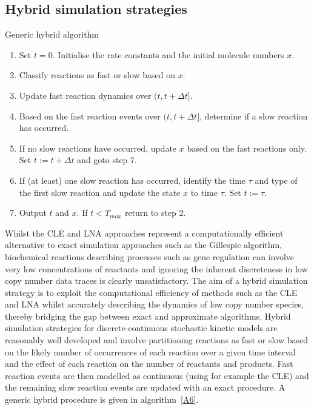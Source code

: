 \documentclass[12pt, DIV12]{scrartcl}
\begin{document}
\subsection{Hybrid simulation strategies}

\begin{algorithm}[t]
\caption{Generic hybrid algorithm}\label{A6}
\begin{enumerate}
\item Set $t=0$. Initialise the rate constants and the initial molecule numbers $x$. 
\item Classify reactions as fast or slow based on $x$.
\item Update fast reaction dynamics over $(t,t+\Delta t]$.
\item Based on the fast reaction events over $(t,t+\Delta t]$, determine if a
  slow reaction has occurred.
\item If no slow reactions have occurred, update $x$ based on the fast reactions
  only. Set $t:=t+\Delta t$ and goto step 7.
\item If (at least) one slow reaction has occurred, identify the time $\tau$ and
  type of the first slow reaction and update the state $x$ to time $\tau$. Set
  $t:=\tau$.
\item Output $t$ and $x$. If $t<T_{max}$ return to step 2.
\end{enumerate}
\end{algorithm}  

Whilst the CLE and LNA approaches represent a computationally efficient
alternative to exact simulation approaches such as the Gillespie algorithm,
biochemical reactions describing processes such as gene regulation can involve
very low concentrations of reactants \cite{guptasarma1995} and ignoring the
inherent discreteness in low copy number data traces is clearly unsatisfactory.
The aim of a hybrid simulation strategy is to exploit the computational
efficiency of methods such as the CLE and LNA whilst accurately describing the
dynamics of low copy number species, thereby bridging the gap between exact and
approximate algorithms. Hybrid simulation strategies for discrete-continuous
stochastic kinetic models are reasonably well developed and involve partitioning
reactions as fast or slow based on the likely number of occurrences of each
reaction over a given time interval and the effect of each reaction on the
number of reactants and products. Fast reaction events are then modelled as
continuous (using for example the CLE) and the remaining slow reaction events
are updated with an exact procedure. A generic hybrid procedure is given in
algorithm~\ref{A6}.
\end{document}
